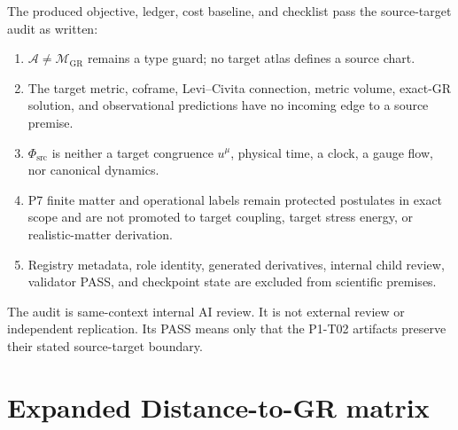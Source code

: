 \documentclass[11pt]{article}
\newcommand{\A}{\mathcal A}
\newcommand{\PhiSrc}{\Phi_{\mathrm{src}}}
\newcommand{\MGR}{\mathcal M_{\mathrm{GR}}}
\begin{document}
The produced objective, ledger, cost baseline, and checklist pass the
source-target audit as written:
\begin{enumerate}
  \item \(\A\neq\MGR\) remains a type guard; no target atlas defines a
  source chart.
  \item The target metric, coframe, Levi--Civita connection, metric volume,
  exact-GR solution, and observational predictions have no incoming edge to a
  source premise.
  \item \(\PhiSrc\) is neither a target congruence \(u^\mu\), physical time,
  a clock, a gauge flow, nor canonical dynamics.
  \item P7 finite matter and operational labels remain protected postulates in
  exact scope and are not promoted to target coupling, target stress energy,
  or realistic-matter derivation.
  \item Registry metadata, role identity, generated derivatives, internal
  child review, validator PASS, and checkpoint state are excluded from
  scientific premises.
\end{enumerate}

The audit is same-context internal AI review. It is not external review or
independent replication. Its PASS means only that the P1-T02 artifacts
preserve their stated source-target boundary.

\section{Expanded Distance-to-GR matrix}
\end{document}
